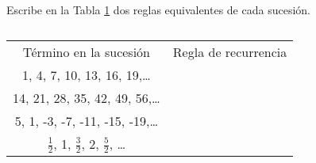 \question[10] Escribe en la Tabla \ref{tab:3.9} dos reglas equivalentes de cada sucesión.

\begin{table}[H]
    \centering
    \caption{}
    \label{tab:3.9}
    \begin{tabular}{c|p{1.5cm}|p{1.5cm}|}
        Término en la sucesión                                    & \multicolumn{2}{c|}{Regla de recurrencia}   \\ \cline{2-3}
        1, 4, 7, 10, 13, 16, 19,\dots                             &                                           & \\ \hline
        14, 21, 28, 35, 42, 49, 56,\dots                          &                                           & \\ \hline
        5, 1, -3, -7, -11, -15, -19,\dots                         &                                           & \\ \hline
        $\frac{1}{2}$, 1,  $\frac{3}{2}$, 2, $\frac{5}{2}$, \dots &                                           & \\ \cline{2-3}
    \end{tabular}
\end{table}
